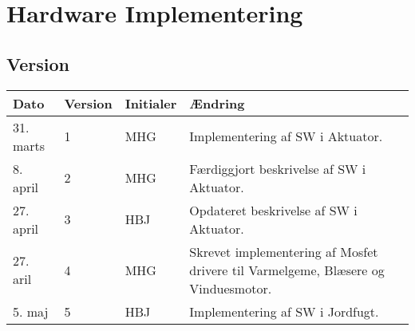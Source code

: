 \chapter{Hardware Implementering} \label{ch:HwImpl}

\section{Version}
\begin{table}[h]
	\centering
	\begin{tabularx}{\textwidth - 2cm}{|l|l|l|X|}
	\hline
	Dato	& Version	& Initialer & Ændring	\\ \hline
	31. marts & 1 & MHG & Implementering af SW i Aktuator. \\ \hline
	8. april & 2 & MHG & Færdiggjort beskrivelse af SW i Aktuator. \\\hline
	27. april & 3 & HBJ & Opdateret beskrivelse af SW i Aktuator. \\\hline
	27. aril & 4 & MHG & Skrevet implementering af Mosfet drivere til Varmelgeme, Blæsere og Vinduesmotor. \\\hline
	5. maj & 5 & HBJ & Implementering af SW i Jordfugt. \\\hline
	\end{tabularx}
\end{table}




